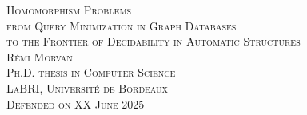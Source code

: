 \begin{titlepage}
\begin{center}
  \Huge\scshape{%
  Homomorphism Problems}\\[.4cm]
  \Large\scshape{%
  from Query Minimization in Graph Databases\\[.2cm]to the Frontier of Decidability in Automatic Structures}\\
  \vfill
  \normalfont\LARGE{} \textsc{Rémi Morvan}\\[1em]
  \Large\scshape
  Ph.D. thesis in Computer Science\\
  \textcolor{maincolor}{LaBRI, Université de Bordeaux}\\
  \normalfont\Large\scshape Defended on XX June 2025
\end{center}
\end{titlepage}
\restoregeometry